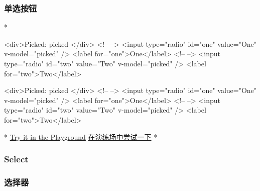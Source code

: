 \begin{paracol}{2}
\subsubsection{单选按钮}
\switchcolumn[0]*%
\begin{codeHtml}
<div>Picked: {{ picked }}</div>
<!-- -->
<input type="radio" id="one" value="One" v-model="picked" />
<label for="one">One</label>
<!-- -->
<input type="radio" id="two" value="Two" v-model="picked" />
<label for="two">Two</label>
\end{codeHtml}
\switchcolumn
\begin{codeHtml}
<div>Picked: {{ picked }}</div>
<!-- -->
<input type="radio" id="one" value="One" v-model="picked" />
<label for="one">One</label>
<!-- -->
<input type="radio" id="two" value="Two" v-model="picked" />
<label for="two">Two</label>
\end{codeHtml}
\switchcolumn[0]*%
\href{https://play.vuejs.org/\#eNqFkDFuwzAMRa9CaHE7tNoDxUBP0A4dtTgWDQiRJUKmHQSG7x7KhpMMAbLxk3z/g5zVD9H3NKI6KDO02RPDgDxSbaPvKWWGGTJ2sECXUw+VrFY22timODCQb8/o4FhWPqrfiNWnjUZvRmIhgrGn0DCKAjDOT/XfCh1gnnd+WYwukwJYNj7SyMBXwqNVuXE+WQXeiUgRpZyaMJaR5BX11SeHQfTmJi1dnNiE5oQBupR3shbC6LX9Posvpdyz/jf1OksOe85ayVqIR5bR9z+o5Qbc6oCk}{Try
it in the Playground}
\switchcolumn
\href{https://play.vuejs.org/\#eNqFkDFuwzAMRa9CaHE7tNoDxUBP0A4dtTgWDQiRJUKmHQSG7x7KhpMMAbLxk3z/g5zVD9H3NKI6KDO02RPDgDxSbaPvKWWGGTJ2sECXUw+VrFY22timODCQb8/o4FhWPqrfiNWnjUZvRmIhgrGn0DCKAjDOT/XfCh1gnnd+WYwukwJYNj7SyMBXwqNVuXE+WQXeiUgRpZyaMJaR5BX11SeHQfTmJi1dnNiE5oQBupR3shbC6LX9Posvpdyz/jf1OksOe85ayVqIR5bR9z+o5Qbc6oCk}{在演练场中尝试一下}
\switchcolumn[0]*%
\subsubsection{Select}
\switchcolumn
\subsubsection{选择器}



\end{paracol}
